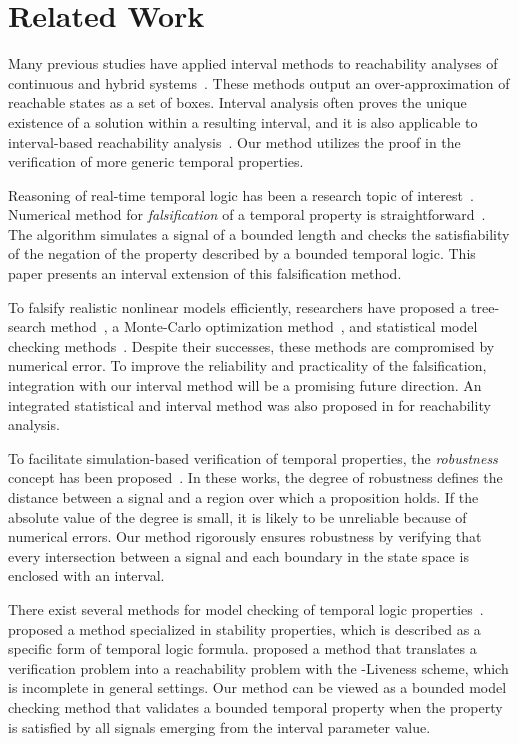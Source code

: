 \documentclass[paper]{ieice}
\begin{document}
\section{Related Work} \label{s:related}

Many previous studies have applied interval methods to reachability analyses of continuous and hybrid systems~\cite{Eggers2008,Collins2008,Ramdani2011,Ishii2011,Chen2012,Gao2013:SMODE}.
These methods output an over-approximation of reachable states as a set of boxes. 
Interval analysis often proves the unique existence of a solution within a resulting interval, and
it is also applicable to interval-based reachability analysis~\cite{Ishii2011,Goubault2014}.
Our method utilizes the proof in the verification of more generic temporal properties.



Reasoning of real-time temporal logic has been a research topic of interest~\cite{Alur1996,Shultz1997}. 
Numerical method for \emph{falsification} of a temporal property is straightforward~\cite{Maler2003}.
The algorithm simulates a signal of a bounded length and checks the satisfiability of the negation of the property described by a bounded temporal logic.
This paper presents an interval extension of this falsification method.

To falsify realistic nonlinear models efficiently, researchers have proposed a tree-search method~\cite{Plaku2009}, a Monte-Carlo optimization method~\cite{Nghiem2010}, and statistical model checking methods~\cite{David2012,Zuliani2013}.
Despite their successes, these methods are compromised by numerical error. To improve the reliability and practicality of the falsification, integration with our interval method will be a promising future direction.
An integrated statistical and interval method was also proposed in \cite{Wang2014} for reachability analysis.

To facilitate simulation-based verification of temporal properties, the \emph{robustness} concept has been proposed~\cite{Fainekos2006a,Donze2010,Nghiem2010}.
In these works, the degree of robustness defines the distance between a signal and a region over which a proposition holds.
If the absolute value of the degree is small, it is likely to be unreliable because of numerical errors.
Our method rigorously ensures robustness by verifying that every intersection between a signal and each boundary in the state space is enclosed with an interval.

There exist several methods for model checking of temporal logic properties~\cite{Podelski2006,Cimatti2014}.
\cite{Podelski2006} proposed a method specialized in stability properties, which is described as a specific form of temporal logic formula.
\cite{Cimatti2014} proposed a method that translates a verification problem into a reachability problem with the -Liveness scheme,
which is incomplete in general settings.
Our method can be viewed as a bounded model checking method that validates a bounded temporal property when the property is satisfied by all signals emerging from the interval parameter value.
\end{document}
